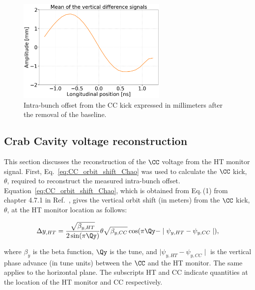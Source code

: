 \begin{figure}[!h]
   \centering         
   \includegraphics[width=0.65\textwidth]{images/Ch4/HT_corrected__20180530_135105_baseline_correction_new_version_CC_post_processing.png}
       \caption{Intra-bunch offset from the CC kick expressed in millimeters after the removal of the baseline.}
       \label{fig:HT_baseline_correction_crabbing_mm}
\end{figure}


 \subsection{Crab Cavity voltage reconstruction}\label{sec:Vcc_calibration}
 This section discusses the reconstruction of the $\CC$ voltage from the HT monitor signal. First, Eq.~\eqref{eq:CC_orbit_shift_Chao} was used to calculate the $\CC$ kick, $\theta$, required to reconstruct the measured intra-bunch offset. Equation~\eqref{eq:CC_orbit_shift_Chao}, which is obtained from Eq.\,(1) from chapter 4.7.1 in Ref.~\cite{Chao:1490001}, gives the vertical orbit shift (in meters) from the $\CC$ kick, $\theta$, at the HT monitor location as follows:

\begin{equation}\label{eq:CC_orbit_shift_Chao}
   \Delta y_{,HT} = \frac{\sqrt{\beta_{y, HT}}}{2 \sin(\pi \Qy)} \theta \sqrt{\beta_{y, CC}} \cos(\pi \Qy - \mid \psi_{y, HT} - \psi_{y, CC} \mid),
\end{equation}

where $\beta_y$ is the beta function, $\Qy$ is the tune, and $\mid \psi_{y, HT} - \psi_{y, CC} \mid$ is the vertical phase advance (in tune units) between the $\CC$ and the HT monitor. The same applies to the horizontal plane. The subscripts HT and CC indicate quantities at the location of the HT monitor and CC respectively.

